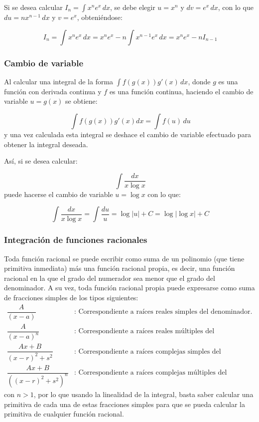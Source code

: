 Si se desea calcular $I_{n}=\int{x^{n}e^{x}}\,dx$, se debe elegir
$u=x^{n}$ y $dv=e^{x}\,dx$, con lo que $du=nx^{n-1}\,dx$ y
$v=e^{x}$, obteniéndose:

\[
\ I_{n}=\int{x^{n}e^{x}}\,dx=x^{n}e^{x}-n\int{x^{n-1}e^{x}}\,dx=x^{n}e^{x}-nI_{n-1}
\]

\subsubsection*{Cambio de variable}

Al calcular una integral de la forma $\int f(g(x))g'(x)\,dx$, donde
$g$ es una función con derivada continua y $f$ es una función
continua, haciendo el cambio de variable $u=g(x)$ se obtiene:

\[
\ \int{f(g(x))g'(x)}dx=\int{f(u)\,du}
\]
y una vez calculada esta integral se deshace el cambio de variable
efectuado para obtener la integral deseada.

Así, si se desea calcular:


\[
\ \int{\frac{dx}{x\log x}}
\]
puede hacerse el cambio de variable $u=\log x$ con lo que:

\[
\ \int{\frac{dx}{x\log x}}=\int{\frac{du}{u}}=\log |u|+ C= \log |\log x| + C
\]

\subsubsection*{Integración de funciones racionales}

Toda función racional se puede escribir como suma de un polinomio (que tiene primitiva inmediata) más una función racional propia, es decir, una función racional en la que el grado del numerador sea menor que el grado del denominador. A su vez, toda función racional propia puede expresarse como suma de fracciones simples de los tipos siguientes:
\[
\begin{array}{cl}
\dfrac{A}{(x-a)}& \textrm{: Correspondiente a raíces reales simples del denominador.}\\
\dfrac{A}{(x-a)^{n}}& \textrm{: Correspondiente a raíces reales múltiples del denominador.}\\
\dfrac{Ax+B}{(x-r)^{2}+s^{2}}& \textrm{: Correspondiente a raíces complejas simples del denominador.}\\
\dfrac{Ax+B}{((x-r)^{2}+s^{2})^{n}} & \textrm{: Correspondiente a raíces complejas múltiples del denominador.}
\end{array}
\]
con $n>1$, por lo que usando la linealidad de la integral, basta saber calcular una primitiva de cada una de estas fracciones simples para que se pueda calcular la primitiva de cualquier función racional.

